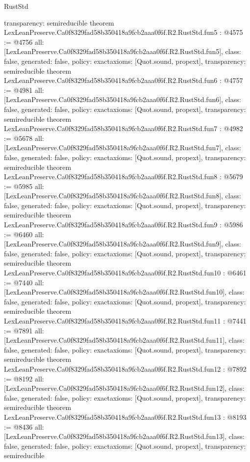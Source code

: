 \begin{lexlean}{RustStd}
\begin{coremodule}
{  transparency: semireducible
}
theorem LexLeanPreserve.Ca0f8329fad58b350418a9fcb2aaa0f6f.R2.RustStd.fun5 : @4575 := @4756 {
  all: [LexLeanPreserve.Ca0f8329fad58b350418a9fcb2aaa0f6f.R2.RustStd.fun5],
  class: false,
  generated: false,
  policy: exact{axioms: [Quot.sound, propext]},
  transparency: semireducible
}
theorem LexLeanPreserve.Ca0f8329fad58b350418a9fcb2aaa0f6f.R2.RustStd.fun6 : @4757 := @4981 {
  all: [LexLeanPreserve.Ca0f8329fad58b350418a9fcb2aaa0f6f.R2.RustStd.fun6],
  class: false,
  generated: false,
  policy: exact{axioms: [Quot.sound, propext]},
  transparency: semireducible
}
theorem LexLeanPreserve.Ca0f8329fad58b350418a9fcb2aaa0f6f.R2.RustStd.fun7 : @4982 := @5678 {
  all: [LexLeanPreserve.Ca0f8329fad58b350418a9fcb2aaa0f6f.R2.RustStd.fun7],
  class: false,
  generated: false,
  policy: exact{axioms: [Quot.sound, propext]},
  transparency: semireducible
}
theorem LexLeanPreserve.Ca0f8329fad58b350418a9fcb2aaa0f6f.R2.RustStd.fun8 : @5679 := @5985 {
  all: [LexLeanPreserve.Ca0f8329fad58b350418a9fcb2aaa0f6f.R2.RustStd.fun8],
  class: false,
  generated: false,
  policy: exact{axioms: [Quot.sound, propext]},
  transparency: semireducible
}
theorem LexLeanPreserve.Ca0f8329fad58b350418a9fcb2aaa0f6f.R2.RustStd.fun9 : @5986 := @6460 {
  all: [LexLeanPreserve.Ca0f8329fad58b350418a9fcb2aaa0f6f.R2.RustStd.fun9],
  class: false,
  generated: false,
  policy: exact{axioms: [Quot.sound, propext]},
  transparency: semireducible
}
theorem LexLeanPreserve.Ca0f8329fad58b350418a9fcb2aaa0f6f.R2.RustStd.fun10 : @6461 := @7440 {
  all: [LexLeanPreserve.Ca0f8329fad58b350418a9fcb2aaa0f6f.R2.RustStd.fun10],
  class: false,
  generated: false,
  policy: exact{axioms: [Quot.sound, propext]},
  transparency: semireducible
}
theorem LexLeanPreserve.Ca0f8329fad58b350418a9fcb2aaa0f6f.R2.RustStd.fun11 : @7441 := @7891 {
  all: [LexLeanPreserve.Ca0f8329fad58b350418a9fcb2aaa0f6f.R2.RustStd.fun11],
  class: false,
  generated: false,
  policy: exact{axioms: [Quot.sound, propext]},
  transparency: semireducible
}
theorem LexLeanPreserve.Ca0f8329fad58b350418a9fcb2aaa0f6f.R2.RustStd.fun12 : @7892 := @8192 {
  all: [LexLeanPreserve.Ca0f8329fad58b350418a9fcb2aaa0f6f.R2.RustStd.fun12],
  class: false,
  generated: false,
  policy: exact{axioms: [Quot.sound, propext]},
  transparency: semireducible
}
theorem LexLeanPreserve.Ca0f8329fad58b350418a9fcb2aaa0f6f.R2.RustStd.fun13 : @8193 := @8436 {
  all: [LexLeanPreserve.Ca0f8329fad58b350418a9fcb2aaa0f6f.R2.RustStd.fun13],
  class: false,
  generated: false,
  policy: exact{axioms: [Quot.sound, propext]},
  transparency: semireducible
}
\end{coremodule}
\end{lexlean}
